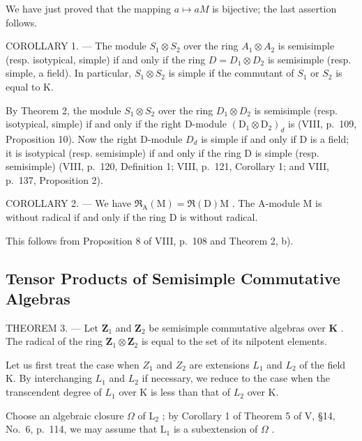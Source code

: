 We have just proved that the mapping \(a \mapsto aM\) is bijective; the last assertion follows.

COROLLARY 1. --- The module \(S_{1} \otimes S_{2}\) over the ring \(A_{1} \otimes A_{2}\) is semisimple (resp. isotypical, simple) if and only if the ring \(D = D_{1} \otimes D_{2}\) is semisimple (resp. simple, a field). In particular, \(S_{1} \otimes S_{2}\) is simple if the commutant of \(S_{1}\) or \(S_{2}\) is equal to K.

By Theorem 2, the module \(S_{1} \otimes S_{2}\) over the ring \(D_{1} \otimes D_{2}\) is semisimple (resp. isotypical, simple) if and only if the right D-module \((\mathrm{D}_{1} \otimes \mathrm{D}_{2})_{d}\) is (VIII, p.~109, Proposition 10). Now the right D-module \(D_{d}\) is simple if and only if D is a field; it is isotypical (resp. semisimple) if and only if the ring D is simple (resp. semisimple) (VIII, p.~120, Definition 1; VIII, p.~121, Corollary 1; and VIII, p.~137, Proposition 2).

COROLLARY 2. --- We have \(\mathfrak{R}_{\mathrm{A}}(\mathrm{M}) = \mathfrak{R}(\mathrm{D})\mathrm{M}\) . The A-module M is without radical if and only if the ring D is without radical.

This follows from Proposition 8 of VIII, p.~108 and Theorem 2, b).

\subsection{Tensor Products of Semisimple Commutative Algebras}

THEOREM 3. --- Let \(\mathbf{Z}_1\) and \(\mathbf{Z}_2\) be semisimple commutative algebras over \(\mathbf{K}\) . The radical of the ring \(\mathbf{Z}_1 \otimes \mathbf{Z}_2\) is equal to the set of its nilpotent elements.

Let us first treat the case when \(Z_{1}\) and \(Z_{2}\) are extensions \(L_{1}\) and \(L_{2}\) of the field K. By interchanging \(L_{1}\) and \(L_{2}\) if necessary, we reduce to the case when the transcendent degree of \(L_{1}\) over K is less than that of \(L_{2}\) over K.

Choose an algebraic closure \(\Omega\) of \(\mathrm{L}_2\) ; by Corollary 1 of Theorem 5 of V, §14, No.~6, p.~114, we may assume that \(\mathrm{L}_1\) is a subextension of \(\Omega\) .


